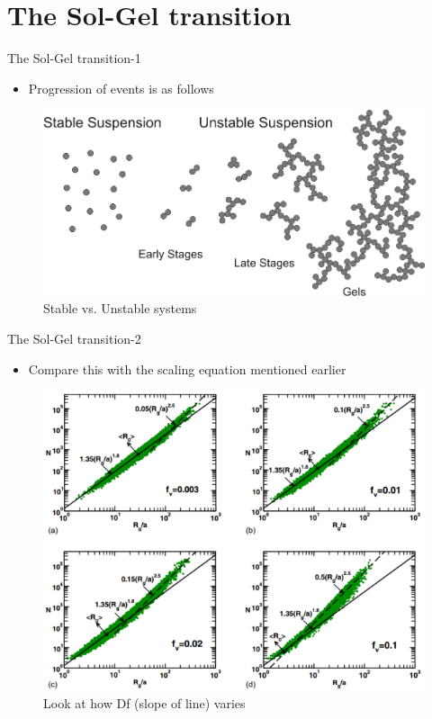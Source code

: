 \documentclass{beamer}
\begin{document}
\section{The Sol-Gel transition}
   \begin{frame}{The Sol-Gel transition-1}
     \begin{itemize}
       \item Progression of events is as follows
    \end{itemize}
    \begin{figure}
        \centering
        \includegraphics[scale=0.55]{gelation.png}
        \caption{Stable vs. Unstable systems}
        \label{fig:my_label}
    \end{figure}
    \end{frame}


\begin{frame}{The Sol-Gel transition-2}
     \begin{itemize}
      \item Compare this with the scaling equation mentioned earlier
    \end{itemize}
    \begin{figure}
        \centering
        \includegraphics[scale=0.55]{Df-variation.png}
        \caption{Look at how Df (slope of line) varies}
        \label{Df-var}
    \end{figure}
    \end{frame}
\end{document}
